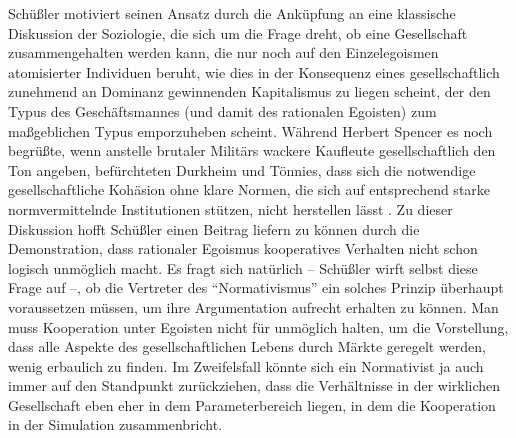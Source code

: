 \documentclass[12pt,a4paper,ngerman]{article}
\begin{document}
Schüßler motiviert seinen Ansatz durch die Anküpfung an eine
klassische Diskussion der Soziologie, die sich um die Frage dreht, ob
eine Gesellschaft zusammengehalten werden kann, die nur noch auf den
Einzelegoismen atomisierter Individuen beruht, wie dies in der
Konsequenz eines gesellschaftlich zunehmend an Dominanz gewinnenden
Kapitalismus zu liegen scheint, der den Typus des Geschäftsmannes (und
damit des rationalen Egoisten) zum maßgeblichen Typus emporzuheben
scheint. Während Herbert Spencer es noch begrüßte, wenn anstelle
brutaler Militärs wackere Kaufleute gesellschaftlich den Ton angeben,
befürchteten Durkheim und Tönnies, dass sich die
notwendige gesellschaftliche Kohäsion ohne klare Normen, die sich auf
entsprechend starke normvermittelnde Institutionen stützen, nicht
herstellen lässt \cite[S. 9-16]{schuessler:1997}. Zu dieser Diskussion hofft
Schüßler einen Beitrag liefern zu können durch die Demonstration, dass
rationaler Egoismus kooperatives Verhalten nicht schon logisch unmöglich macht.
Es fragt sich natürlich -- Schüßler wirft selbst diese Frage auf
\cite[S. 91/92]{schuessler:1997} --, ob die Vertreter des "`Normativismus"' ein
solches Prinzip überhaupt voraussetzen müssen, um ihre Argumentation aufrecht
erhalten zu können. Man muss Kooperation unter Egoisten nicht für unmöglich
halten, um die Vorstellung, dass alle Aspekte des gesellschaftlichen
Lebens durch Märkte geregelt werden, wenig erbaulich zu finden. Im
Zweifelsfall könnte sich ein Normativist ja auch immer auf den
Standpunkt zurückziehen, dass die Verhältnisse in der wirklichen
Gesellschaft eben eher in dem Parameterbereich liegen, in dem die
Kooperation in der Simulation zusammenbricht.
\end{document}
